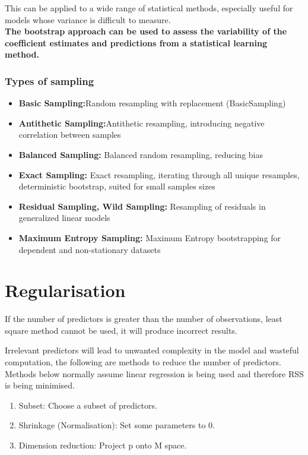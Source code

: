 \documentclass[11pt]{scrartcl} %
\begin{document}
This can be applied to a wide range of statistical methods, especially useful for models whose variance
is difficult to measure.\\

\textbf{The bootstrap approach can be used  to assess the
variability of the coefficient estimates and predictions from a statistical learning method.}

\subsubsection{Types of sampling}

\begin{itemize}
	\item \textbf{Basic Sampling:}Random resampling with replacement (BasicSampling)
	\item \textbf{Antithetic Sampling:}Antithetic resampling, introducing negative correlation between samples
	\item \textbf{Balanced Sampling:} Balanced random resampling, reducing bias
	\item \textbf{Exact Sampling:} Exact resampling, iterating through all unique resamples, deterministic bootstrap, suited for small samples sizes
	\item \textbf{Residual Sampling, Wild Sampling:} Resampling of residuals in generalized linear models 
	\item \textbf{Maximum Entropy Sampling:} Maximum Entropy bootstrapping for dependent and non-stationary datasets 
\end{itemize}

\section{Regularisation}

If the number of predictors is greater than the number of observations, least square method cannot be 
used, it will produce incorrect results.

Irrelevant predictors will lead to unwanted complexity in the model and wasteful computation, the following are methods
to reduce the number of predictors.\\

Methods below normally assume linear regression is being used and therefore RSS is being minimised.

\begin{enumerate}
	\item Subset: Choose a subset of predictors.
	\item Shrinkage (Normalisation): Set some parameters to 0.
	\item Dimension reduction: Project p onto M space.
\end{enumerate}
\end{document}
